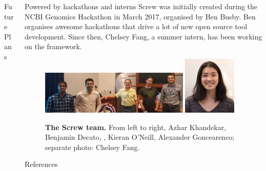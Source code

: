 \documentclass{beamer}
\begin{document}
\begin{frame}
\begin{columns}[t]
\begin{column}{.65\textwidth}
\begin{columns}[t,totalwidth=\textwidth]
\begin{column}{.48\textwidth}
\begin{block}{Future Plans}
\end{block}
\end{column}

	\begin{column}{.48\textwidth}
\begin{block}{Powered by hackathons and interns}
Screw was initially created during the NCBI Genomics Hackathon in March 2017, organised by Ben Busby. Ben organises awesome hackathons that drive a lot of new open source tool development. Since then, Chelsey Fang, a summer intern, has been working on the framework.


\begin{figure}
\begin{center}
  \includegraphics[width=0.7\textwidth]{figures/hackathon_team.jpg}
  \includegraphics[width=0.25\textwidth]{figures/chelsey.jpg}
\end{center}
\caption{\textbf{The Screw team.} From left to right, Azhar Khandekar, Benjamin Decato, , Kieran O'Neill, Alexander Goncearenco; separate photo: Chelsey Fang.}
\end{figure}

\end{block}

\begin{block}{References}

\printbibliography[heading=none]
\end{block}



 
\end{column}

  \end{columns}
\end{column}


\end{columns}

\end{frame}
\end{document}
